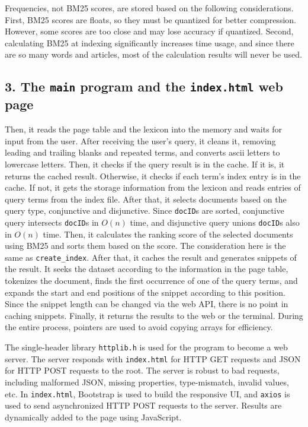 \documentclass[12pt]{article}
\begin{document}
Frequencies, not BM25 scores, are stored based on the following
considerations. First, BM25 scores are floats, so they must be quantized
for better compression. However, some scores are too close and may lose
accuracy if quantized. Second, calculating BM25 at indexing
significantly increases time usage, and since there are so many words
and articles, most of the calculation results will never be used.

\hypertarget{3-the-main-program-and-the-indexhtml-web-page}{%
\subsection{\texorpdfstring{3. The \texttt{main} program and the
\texttt{index.html} web
page}{3. The main program and the index.html web page}}\label{3-the-main-program-and-the-indexhtml-web-page}}

Then, it reads the page table and the lexicon into the memory and waits
for input from the user. After receiving the user's query, it cleans it,
removing leading and trailing blanks and repeated terms, and converts
ascii letters to lowercase letters. Then, it checks if the query result
is in the cache. If it is, it returns the cached result. Otherwise, it
checks if each term's index entry is in the cache. If not, it gets the
storage information from the lexicon and reads entries of query terms
from the index file. After that, it selects documents based on the query
type, conjunctive and disjunctive. Since \texttt{docID}s are sorted,
conjunctive query intersects \texttt{docID}s in \(O(n)\) time, and
disjunctive query unions \texttt{docID}s also in \(O(n)\) time. Then, it
calculates the ranking score of the selected documents using BM25 and
sorts them based on the score. The consideration here is the same as
\texttt{create\_index}. After that, it caches the result and generates
snippets of the result. It seeks the dataset according to the
information in the page table, tokenizes the document, finds the first
occurrence of one of the query terms, and expands the start and end
positions of the snippet according to this position. Since the snippet
length can be changed via the web API, there is no point in caching
snippets. Finally, it returns the results to the web or the terminal.
During the entire process, pointers are used to avoid copying arrays for
efficiency.

The single-header library \texttt{httplib.h} is used for the program to
become a web server. The server responds with \texttt{index.html} for
HTTP GET requests and JSON for HTTP POST requests to the root. The
server is robust to bad requests, including malformed JSON, missing
properties, type-mismatch, invalid values, etc. In \texttt{index.html},
Bootstrap is used to build the responsive UI, and \texttt{axios} is used
to send asynchronized HTTP POST requests to the server. Results are
dynamically added to the page using JavaScript.
\end{document}
